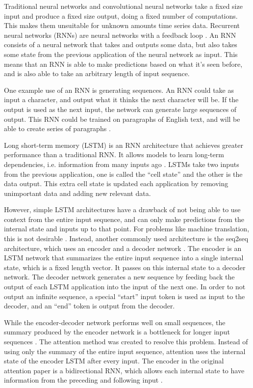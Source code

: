 \documentclass[12pt]{article}
\begin{document}
Traditional neural networks and convolutional neural networks take a fixed size input and produce a fixed size output, doing a fixed number of computations. This makes them unsuitable for unknown amounts time series data. Recurrent neural networks (RNNs) are neural networks with a feedback loop \cite{ColahLSTM}. An RNN consists of a neural network that takes and outputs some data, but also takes some state from the previous application of the neural network as input. This means that an RNN is able to make predictions based on what it's seen before, and is also able to take an arbitrary length of input sequence.

One example use of an RNN is generating sequences. An RNN could take as input a character, and output what it thinks the next character will be. If the output is used as the next input, the network can generate large sequences of output. This RNN could be trained on paragraphs of English text, and will be able to create series of paragraphs \cite{RNNEffectiveness}.

Long short-term memory (LSTM) is an RNN architecture that achieves greater performance than a traditional RNN. It allows models to learn long-term dependencies, i.e. information from many inputs ago \cite{ColahLSTM}. LSTMs take two inputs from the previous application, one is called the ``cell state'' and the other is the data output. This extra cell state is updated each application by removing unimportant data and adding new relevant data. 

However, simple LSTM architectures have a drawback of not being able to use context from the entire input sequence, and can only make predictions from the internal state and inputs up to that point. For problems like machine translation, this is not desirable \cite{weng2018attention}. Instead, another commonly used architecture is the seq2seq architecture, which uses an encoder and a decoder network \cite{seq2seq}. The encoder is an LSTM network that summarizes the entire input sequence into a single internal state, which is a fixed length vector. It passes on this internal state to a decoder network. The decoder network generates a new sequence by feeding back the output of each LSTM application into the input of the next one. In order to not output an infinite sequence, a special ``start'' input token is used as input to the decoder, and an ``end'' token is output from the decoder. 

While the encoder-decoder network performs well on small sequences, the summary produced by the encoder network is a bottleneck for longer input sequences \cite{weng2018attention}. The attention method was created to resolve this problem. Instead of using only the summary of the entire input sequence, attention uses the internal state of the encoder LSTM after every input. The encoder in the original attention paper is a bidirectional RNN, which allows each internal state to have information from the preceding and following input \cite{AttentionPaper}.
\end{document}
